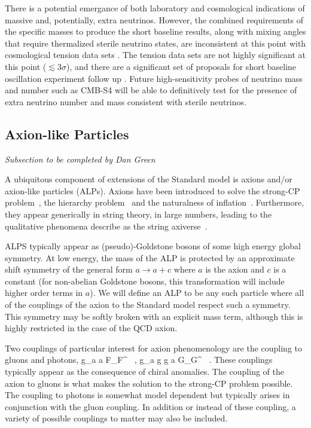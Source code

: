 There is a potential emergance of both laboratory and cosmological
indications of massive and, potentially, extra neutrinos. However, the
combined requirements of the specific masses to produce the short
baseline results, along with mixing angles that require thermalized
sterile neutrino states, are inconsistent at this point with
cosmological tension data sets
\cite{Joudaki:2012uk,Archidiacono:2013xxa}. The tension data sets are
not highly significant at this point ($\lesssim 3\sigma$), and there
are a significant set of proposals for short baseline oscillation
experiment follow up \cite{Abazajian:2012ys}. Future high-sensitivity
probes of neutrino mass and number such as CMB-S4 will be able to
definitively test for the presence of extra neutrino number and mass
consistent with sterile neutrinos.


\subsection{Axion-like Particles}

{\it Subsection to be completed by Dan Green}

A ubiquitous component of extensions of the Standard model is axions and/or axion-like particles (ALPs).  Axions have been introduced to solve the strong-CP problem~\cite{Peccei:1977hh}, the hierarchy problem~\cite{Graham:2015cka} and the naturalness of inflation~\cite{Freese:1990rb}.  Furthermore, they appear generically in string theory, in large numbers, leading to the qualitative phenomena describe as the string axiverse~\cite{Arvanitaki:2009fg}.

ALPS typically appear as (pseudo)-Goldstone bosons of some high energy global symmetry.  At low energy, the mass of the ALP is protected by an approximate shift symmetry of the general form $a \to a + c$ where $a$ is the axion and $c$ is a constant (for non-abelian Goldstone bosons, this transformation will include higher order terms in $a$).  We will define an ALP to be any such particle where all of the couplings of the axion to the Standard model respect such a symmetry.  This symmetry may be softly broken with an explicit mass term, although this is highly restricted in the case of the QCD axion.

Two couplings of particular interest for axion phenomenology are the coupling to gluons and photons, 
\beq
{} g_{a \gamma \gamma} a \tilde F_{\mu \nu}F^{\mu\nu} \ , \qquad \qquad {} g_{a g g} a \tilde G_{\mu \nu}G^{\mu\nu}  \ .
\eeq
These couplings typically appear as the consequence of chiral anomalies.  The coupling of the axion to gluons is what makes the solution to the strong-CP problem possible.  The coupling to photons is somewhat model dependent but typically arises in conjunction with the gluon coupling.  In addition or instead of these coupling, a variety of possible couplings to matter may also be included.

